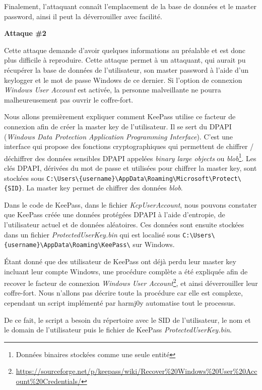 Finalement, l'attaquant connaît l'emplacement de la base de données et le master password, ainsi il peut la déverrouiller avec facilité. 

\textbf{Attaque \#2}

Cette attaque demande d'avoir quelques informations au préalable et est donc plus difficile à reproduire. Cette attaque permet à un attaquant, qui aurait pu récupérer la base de données de l'utilisateur, son master password à l'aide d'un keylogger et le mot de passe Windows de ce dernier. Si l'option de connexion \textit{Windows User Account} est activée, la personne malveillante ne pourra malheureusement pas ouvrir le coffre-fort. 

Nous allons premièrement expliquer comment KeePass utilise ce facteur de connexion afin de créer la master key de l'utilisateur. Il se sert du DPAPI (\textit{Windows Data Protection Application Programming Interface})\cite{dpapi}. C'est une interface qui propose des fonctions cryptographiques qui permettent de chiffrer / déchiffrer des données sensibles DPAPI appelées \textit{binary large objects} ou \textit{blob}\footnote{Données binaires stockées comme une seule entité}. Les clés DPAPI, dérivées du mot de passe et utilisées pour chiffrer la master key, sont stockées sous \verb|C:\Users\{username}\AppData\Roaming\Microsoft\Protect\{SID}|. La master key permet de chiffrer des données \textit{blob}.

Dans le code de KeePass, dans le fichier \textit{KcpUserAccount}, nous pouvons constater que KeePass créée une données protégées DPAPI à l'aide d'entropie, de l'utilisateur actuel et de données aléatoires. Ces données sont ensuite stockées dans un fichier \textit{ProtectedUserKey.bin} qui est localisé sous \verb|C:\Users\{username}\AppData\Roaming\KeePass\| sur Windows. 

Étant donné que des utilisateur de KeePass ont déjà perdu leur master key incluant leur compte Windows, une procédure complète a été expliquée afin de recover le facteur de connexion \textit{Windows User Account}\footnote{\href{https://sourceforge.net/p/keepass/wiki/Recover\%20Windows\%20User\%20Account\%20Credentials/}{https://sourceforge.net/p/keepass/wiki/Recover\%20Windows\%20User\%20Account\%20Credentials/}}, et ainsi déverrouiller leur coffre-fort. Nous n'allons pas décrire toute la procédure car elle est complexe, cependant un script implémenté par harmj0y automatise tout le processus\cite{restore_dpapi}. 

De ce fait, le script a besoin du répertoire avec le SID de l'utilisateur, le nom et le domain de l'utilisateur puis le fichier de KeePass \textit{ProtectedUserKey.bin}.


